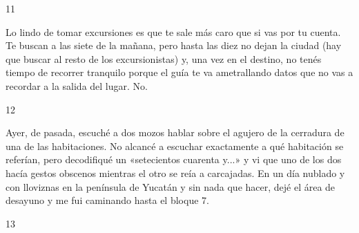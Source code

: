 \documentclass[12pt,twoside,openright,a5paper]{book}
\begin{document}
\vspace{0.5cm}

\hrulefill \hspace{0.1cm}\decofourleft\hspace{0.2cm} 11 \hspace{0.2cm}\decofourright \hspace{0.1cm}\hrulefill

\nopagebreak

\vspace{0.5cm}

\nopagebreak

Lo lindo de tomar excursiones es que te sale más caro que si vas por tu
cuenta. Te buscan a las siete de la mañana, pero hasta las diez no dejan la ciudad (hay que
buscar al resto de los excursionistas) y, una vez en el destino, no tenés
tiempo de recorrer tranquilo porque el guía te va ametrallando datos que
no vas a recordar a la salida del lugar. No.

\vspace{0.5cm}

\hrulefill \hspace{0.1cm}\decofourleft\hspace{0.2cm} 12 \hspace{0.2cm}\decofourright \hspace{0.1cm}\hrulefill

\nopagebreak

\vspace{0.5cm}

\nopagebreak

Ayer, de pasada, escuché a dos mozos hablar sobre el agujero de la cerradura de
una de las habitaciones. No alcancé a escuchar exactamente a qué habitación
se referían, pero decodifiqué un «setecientos cuarenta y...» y vi que uno
de los dos hacía gestos obscenos mientras el otro se reía a carcajadas. 
En un día nublado y con lloviznas en la península de Yucatán y sin nada 
que hacer, dejé el área de desayuno y me fui caminando hasta el bloque 7.

\vspace{0.5cm}

\hrulefill \hspace{0.1cm}\decofourleft\hspace{0.2cm} 13 \hspace{0.2cm}\decofourright \hspace{0.1cm}\hrulefill

\nopagebreak

\vspace{0.5cm}
\end{document}
